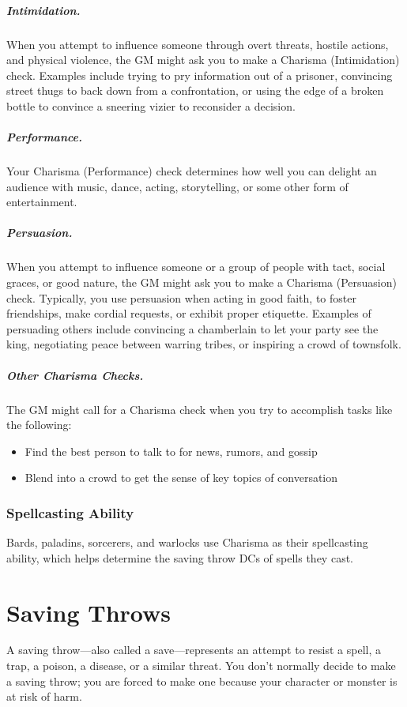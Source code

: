 \subparagraph*{Intimidation.} When you attempt to influence someone through overt threats, hostile actions, and physical violence, the GM might ask you to make a Charisma (Intimidation) check. Examples include trying to pry information out of a prisoner, convincing street thugs to back down from a confrontation, or using the edge of a broken bottle to convince a sneering vizier to reconsider a decision.

\subparagraph*{Performance.} Your Charisma (Performance) check determines how well you can delight an audience with music, dance, acting, storytelling, or some other form of entertainment.

\subparagraph*{Persuasion.} When you attempt to influence someone or a group of people with tact, social graces, or good nature, the GM might ask you to make a Charisma (Persuasion) check. Typically, you use persuasion when acting in good faith, to foster friendships, make cordial requests, or exhibit proper etiquette. Examples of persuading others include convincing a chamberlain to let your party see the king, negotiating peace between warring tribes, or inspiring a crowd of townsfolk.

\subparagraph*{Other Charisma Checks.} The GM might call for a Charisma check when you try to accomplish tasks like the following:

\begin{itemize}
    \item Find the best person to talk to for news, rumors, and gossip
    \item Blend into a crowd to get the sense of key topics of conversation
\end{itemize}

\subsubsection{Spellcasting Ability}

Bards, paladins, sorcerers, and warlocks use Charisma as their spellcasting ability, which helps determine the saving throw DCs of spells they cast.

\section{Saving Throws}
A saving throw—also called a save—represents an attempt to resist a spell, a trap, a poison, a disease, or a similar threat. You don't normally decide to make a saving throw; you are forced to make one because your character or monster is at risk of harm.

